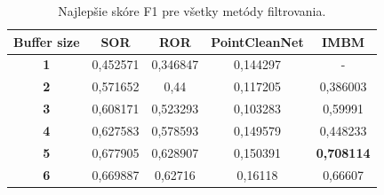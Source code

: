 \begin{table}[H]
	\caption{\label{tab:final_comp} Najlepšie skóre F1 pre všetky metódy filtrovania. }
	\centering
	\begin{tabular}{ccccc}
		\toprule
		\textbf{Buffer size} & \textbf{SOR} & \textbf{ROR} & \textbf{PointCleanNet} & \textbf{IMBM}     \\ 
		\midrule
		\textbf{1}           & 0,452571     & 0,346847     & 0,144297               & -                 \\ 
		\textbf{2}           & 0,571652     & 0,44         & 0,117205               & 0,386003          \\ 
		\textbf{3}           & 0,608171     & 0,523293     & 0,103283               & 0,59991           \\ 
		\textbf{4}           & 0,627583     & 0,578593     & 0,149579               & 0,448233          \\ 
		\textbf{5}           & 0,677905     & 0,628907     & 0,150391               & \textbf{0,708114} \\ 
		\textbf{6}           & 0,669887     & 0,62716      & 0,16118                & 0,66607           \\ 
		\bottomrule
	\end{tabular}
\end{table}

